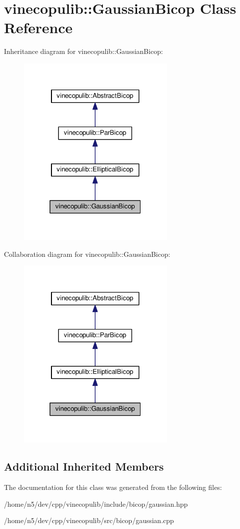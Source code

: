 \hypertarget{classvinecopulib_1_1_gaussian_bicop}{}\section{vinecopulib\+:\+:Gaussian\+Bicop Class Reference}
\label{classvinecopulib_1_1_gaussian_bicop}


Inheritance diagram for vinecopulib\+:\+:Gaussian\+Bicop\+:\nopagebreak
\begin{figure}[H]
\begin{center}
\leavevmode
\includegraphics[width=217pt]{classvinecopulib_1_1_gaussian_bicop__inherit__graph}
\end{center}
\end{figure}


Collaboration diagram for vinecopulib\+:\+:Gaussian\+Bicop\+:\nopagebreak
\begin{figure}[H]
\begin{center}
\leavevmode
\includegraphics[width=217pt]{classvinecopulib_1_1_gaussian_bicop__coll__graph}
\end{center}
\end{figure}
\subsection*{Additional Inherited Members}


The documentation for this class was generated from the following files\+:\begin{DoxyCompactItemize}
\item 
/home/n5/dev/cpp/vinecopulib/include/bicop/gaussian.\+hpp\item 
/home/n5/dev/cpp/vinecopulib/src/bicop/gaussian.\+cpp\end{DoxyCompactItemize}
